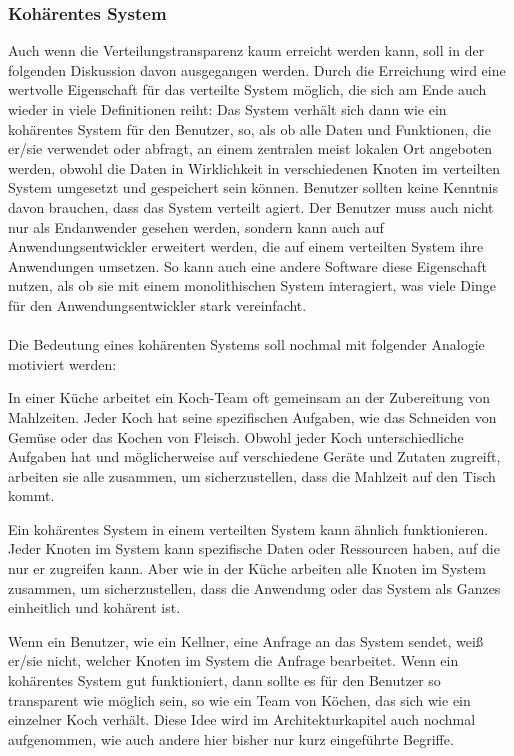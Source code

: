 \subsubsection{Kohärentes System}
Auch wenn die Verteilungstransparenz kaum erreicht werden kann, soll in der folgenden Diskussion davon ausgegangen werden. Durch die Erreichung wird eine wertvolle Eigenschaft für das verteilte System möglich, die sich am Ende auch wieder in viele Definitionen reiht: Das System verhält sich dann wie ein kohärentes System für den Benutzer, so, als ob alle Daten und Funktionen, die er/sie verwendet oder abfragt, an einem zentralen meist lokalen Ort angeboten werden, obwohl die Daten in Wirklichkeit in verschiedenen Knoten im verteilten System umgesetzt und gespeichert sein können. Benutzer sollten keine Kenntnis davon brauchen, dass das System verteilt agiert. Der Benutzer muss auch nicht nur als Endanwender gesehen werden, sondern kann auch auf Anwendungsentwickler erweitert werden, die auf einem verteilten System ihre Anwendungen umsetzen. 
So kann auch eine andere Software diese Eigenschaft nutzen, als ob sie mit einem monolithischen System interagiert, was viele Dinge für den Anwendungsentwickler stark vereinfacht. 
\\\\
Die Bedeutung eines kohärenten Systems soll nochmal mit folgender Analogie motiviert werden:

In einer Küche arbeitet ein Koch-Team oft gemeinsam an der Zubereitung von Mahlzeiten. Jeder Koch hat seine spezifischen Aufgaben, wie das Schneiden von Gemüse oder das Kochen von Fleisch. Obwohl jeder Koch unterschiedliche Aufgaben hat und möglicherweise auf verschiedene Geräte und Zutaten zugreift, arbeiten sie alle zusammen, um sicherzustellen, dass die Mahlzeit auf den Tisch kommt.

Ein kohärentes System in einem verteilten System kann ähnlich funktionieren. Jeder Knoten im System kann spezifische Daten oder Ressourcen haben, auf die nur er zugreifen kann. Aber wie in der Küche arbeiten alle Knoten im System zusammen, um sicherzustellen, dass die Anwendung oder das System als Ganzes einheitlich und kohärent ist.

Wenn ein Benutzer, wie ein Kellner, eine Anfrage an das System sendet, weiß er/sie nicht, welcher Knoten im System die Anfrage bearbeitet. Wenn ein kohärentes System gut funktioniert, dann sollte es für den Benutzer so transparent wie möglich sein, so wie ein Team von Köchen, das sich wie ein einzelner Koch verhält. Diese Idee wird im Architekturkapitel auch nochmal aufgenommen, wie auch andere hier bisher nur kurz eingeführte Begriffe. 

